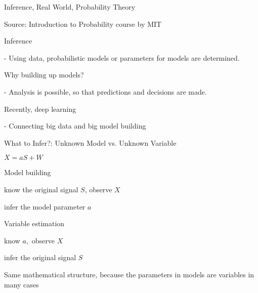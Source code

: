 \begin{frame}{Inference, Real World, Probability Theory}

\begin{center}
\vspace{-0.7cm}
{\scriptsize Source: Introduction to Probability course by MIT}
\end{center}

\vspace{-0.5cm}
\plitemsep 0.05in
\bci
\item<2-> Inference

- Using data, probabilistic models or parameters for models are determined.

\item<3-> Why building up models?

- Analysis is possible, so that predictions and decisions are made.

\item<4-> Recently, deep learning

- Connecting big data and big model building

\eci

\end{frame}

\begin{frame}{What to Infer?: Unknown Model vs. Unknown Variable}

\begin{center}
\end{center}

\vspace{-0.5cm}
\plitemsep 0.05in
\bci
\item $X = aS + W$

\item<2-> Model building
\bci
\item know the original signal $S$, observe $X$
\item infer the model parameter $a$
\eci

\item<3-> Variable estimation
\bci
\item know $a,$ observe $X$
\item infer the original signal $S$
\eci


\item<4-> Same mathematical structure, because the parameters in models are variables in many cases

\eci

\end{frame}

